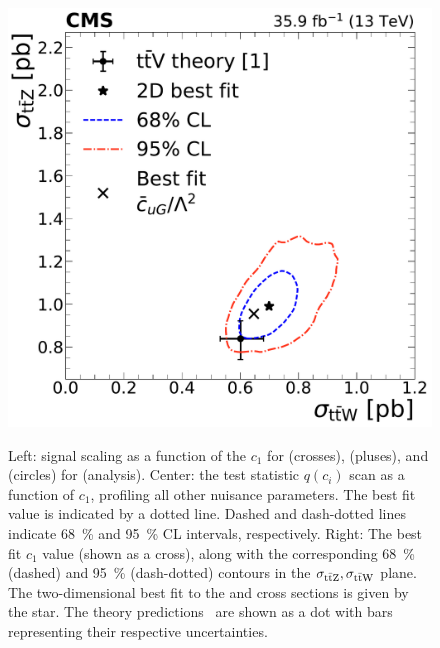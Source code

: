 \begin{landscape}
\begin{figure}
{        \includegraphics[height=\textheight]{figures/thirteen-TeV/NP/2D/ttZ_ttW_2D_1D_cuG}
      }
    \setlength{\capwidth}{14cm}
    \caption[Profile likelihood, $\mu(c_1)$, and best fit $c_1$ for \cuG (\thirteenTeV)]{Left: signal scaling as a function of the $c_1$ for \ttW (crosses), \ttZ (pluses), and \ttH (circles) for \cuG (\thirteenTeV analysis). Center: the test statistic $q(c_i)$ scan as a function of $c_1$, profiling all other nuisance parameters. The best fit value is indicated by a dotted line. Dashed and dash-dotted lines indicate \SI{68}{\percent} and \SI{95}{\percent} CL intervals, respectively. Right: The best fit $c_1$ value (shown as a cross), along with the corresponding \SI{68}{\percent} (dashed) and \SI{95}{\percent} (dash-dotted) contours in the $\sigma_{\text{t}\bar{\text{t}}\text{Z}}, \sigma_{\text{t}\bar{\text{t}}\text{W}}$ plane. The two-dimensional best fit to the \ttW and \ttZ cross sections is given by the star. The theory predictions~\cite{deFlorian:2016spz} are shown as a dot with bars representing their respective uncertainties.}%
    \label{fig:results-cuG}
  \end{figure}
  \begin{figure}
      \resizebox{!}{7.2cm}{
}
\end{figure}
\end{landscape}
